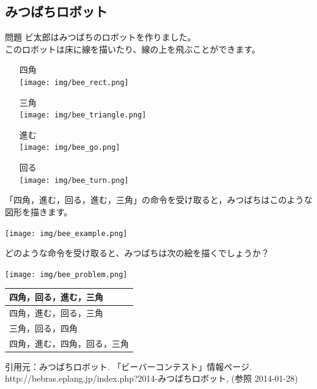 \documentclass[a4paper]{jarticle}
\begin{document}
\begin{multicols}{2}
\subsection{みつばちロボット}
\begin{itembox}[l]{問題}
ビ太郎はみつばちのロボットを作りました。\\このロボットは床に線を描いたり、線の上を飛ぶことができます。
\begin{itemize}
\item[四角]\mbox{}\\  \texttt{[image: img/bee\_rect.png]}
\item[三角]\mbox{}\\  \texttt{[image: img/bee\_triangle.png]}
\item[進む]\mbox{}\\  \texttt{[image: img/bee\_go.png]}
\item[回る]\mbox{}\\  \texttt{[image: img/bee\_turn.png]}
\end{itemize}
「四角，進む，回る，進む，三角」の命令を受け取ると，みつばちはこのような図形を描きます。
\begin{center}
\texttt{[image: img/bee\_example.png]}
\end{center}
どのような命令を受け取ると、みつばちは次の絵を描くでしょうか？
\begin{center}
\texttt{[image: img/bee\_problem.png]}
\end{center}
\begin{center}
\begin{tabular}{|p{5cm}|} \hline
四角，回る，進む，三角\\ \hline
四角，進む，回る，三角\\ \hline
三角，回る，四角\\ \hline
四角，進む，四角，回る，三角\\ \hline
\end{tabular}
\end{center}
{ \scriptsize 引用元：みつばちロボット. 「ビーバーコンテスト」情報ページ. http://bebras.eplang.jp/index.php?2014-みつばちロボット, (参照 2014-01-28)}
\end{itembox}


\end{multicols}
\end{document}
